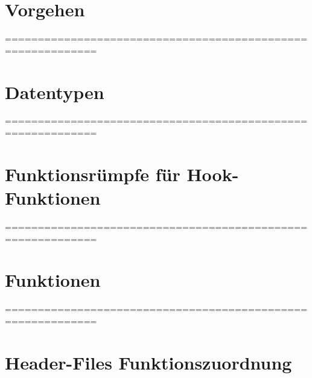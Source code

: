 \documentclass[a4paper, 11pt, DIV14, oneside]{scrartcl}
\newcommand{\qline}[0]{============================================================\\}
\begin{document}
\tableofcontents
\newpage

\hypersetup{linkcolor=blue}


\section{Vorgehen}


\qline \newpage

\section{Datentypen}


\qline \newpage

\section{Funktionsrümpfe für Hook-Funktionen}\label{k:hookfunkbsp}


\qline \newpage

\section{Funktionen}


\qline \newpage
\section{Header-Files Funktionszuordnung}


%
%
%
\end{document}

